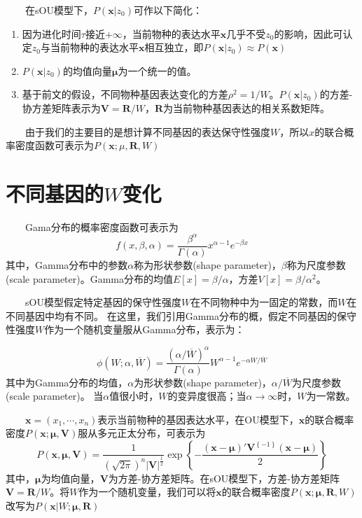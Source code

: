\documentclass[]{article}
\providecommand{\tightlist}{%
  \setlength{\itemsep}{0pt}\setlength{\parskip}{0pt}}
\begin{document}
  在sOU模型下，\(P(\boldsymbol{x}|z_0)\)可作以下简化：

\begin{enumerate}
\def\labelenumi{\arabic{enumi}.}
\tightlist
\item
  因为进化时间\(\tau\)接近\(+\infty\)，当前物种的表达水平\(\boldsymbol{x}\)几乎不受\(z_0\)的影响，因此可认定\(z_0\)与当前物种的表达水平\(\boldsymbol{x}\)相互独立，即\(P(\boldsymbol{x}|z_0) \approx P(\boldsymbol{x})\)
\item
  \(P(\boldsymbol{x}|z_0)\)的均值向量\(\boldsymbol{\mu}\)为一个统一的值。
\item
  基于前文的假设，不同物种基因表达变化的方差\(\rho^2=1/W\)。\(P(\boldsymbol{x}|z_0)\)的方差-协方差矩阵表示为\(\boldsymbol{V}=\boldsymbol{R}/W\)，\(\boldsymbol{R}\)为当前物种基因表达的相关系数矩阵。
\end{enumerate}

  由于我们的主要目的是想计算不同基因的表达保守性强度\(W\)，所以\(x\)的联合概率密度函数可表示为\(P(\boldsymbol{x};\mu,\boldsymbol{R}, W)\)

\hypertarget{w}{%
\section{\texorpdfstring{不同基因的\(W\)变化}{不同基因的W变化}}\label{w}}

  Gama分布的概率密度函数可表示为
\[f\left(x,\beta,\alpha\right)=\frac{\beta^{\alpha}}{\Gamma\left(\alpha\right)}x^{\alpha-1}e^{-\beta x}\]
其中，Gamma分布中的参数\(\alpha\)称为形状参数(shape
parameter)，\(\beta\)称为尺度参数(scale
parameter)。Gamma分布的均值\(E[x]=\beta/\alpha\)，方差\(V[x]=\beta/\alpha^2\)。

  sOU模型假定特定基因的保守性强度\(W\)在不同物种中为一固定的常数，而\(W\)在不同基因中均有不同。
在这里，我们引用Gamma分布的概，假定不同基因的保守性强度\(W\)作为一个随机变量服从Gamma分布，表示为：

\[\phi\left(W;\alpha,\overline{W}\right)=\frac{(\alpha/\overline{W})^\alpha}{\Gamma\left(\alpha\right)}W^{\alpha-1}e^{-\alpha W/\overline{W}}\]
其中为Gamma分布的均值，\(\alpha\)为形状参数(shape
parameter)，\(\alpha/\overline{W}\)为尺度参数(scale parameter)。
当\(\alpha\)值很小时，\(W\)的变异度很高；当\(\alpha\rightarrow\infty\)时，\(W\)为一常数。

  \(\boldsymbol{x}=(x_1,\cdots,x_n)\)表示当前物种的基因表达水平，在OU模型下，\(\boldsymbol{x}\)的联合概率密度\(P(\boldsymbol{x;\mu,V})\)服从多元正太分布，可表示为
\[P\left(\boldsymbol{x,\mu,V}\right)=\frac{1}{\left(\sqrt{2\pi}\right)^n\left|\boldsymbol{V}\right|^{\frac{1}{2}}}\exp\left\{-\frac{\left(\boldsymbol{x}-\boldsymbol{\mu}\right)'\boldsymbol{V}^{\left\{-1\right\}}\left(\boldsymbol{x}-\boldsymbol{\mu}\right)}{2}\right\}\]
其中，\(\boldsymbol{\mu}\)为均值向量，\(\boldsymbol{V}\)为方差-协方差矩阵。在sOU模型下，方差-协方差矩阵\(\boldsymbol{V}=\boldsymbol{R}/W\)。将\(W\)作为一个随机变量，我们可以将\(\boldsymbol{x}\)的联合概率密度\(P(\boldsymbol{x};\boldsymbol{\mu},\boldsymbol{R},W)\)改写为\(P(\boldsymbol{x}|W;\boldsymbol{\mu,R})\)
\end{document}
